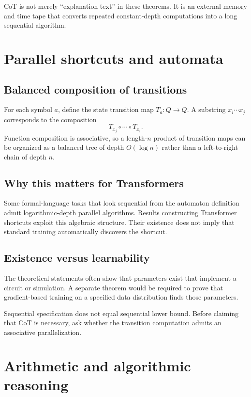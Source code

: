 \documentclass[11pt,a4paper,oneside,openany]{memoir}
\theoremstyle{definition}
\begin{document}
\begin{presentbox}
CoT is not merely ``explanation text'' in these theorems.  It is an external memory and time tape that converts repeated constant-depth computations into a long sequential algorithm.
\end{presentbox}

\chapter{Parallel shortcuts and automata}
\section{Balanced composition of transitions}
For each symbol $a$, define the state transition map $T_a:Q\to Q$.  A substring $x_i\cdots x_j$ corresponds to the composition
\[
T_{x_j}\circ\cdots\circ T_{x_i}.
\]
Function composition is associative, so a length-$n$ product of transition maps can be organized as a balanced tree of depth $O(\log n)$ rather than a left-to-right chain of depth $n$.

\section{Why this matters for Transformers}
Some formal-language tasks that look sequential from the automaton definition admit logarithmic-depth parallel algorithms.  Results constructing Transformer shortcuts exploit this algebraic structure.  Their existence does not imply that standard training automatically discovers the shortcut.

\section{Existence versus learnability}
The theoretical statements often show that parameters exist that implement a circuit or simulation.  A separate theorem would be required to prove that gradient-based training on a specified data distribution finds those parameters.

\begin{presentbox}
Sequential specification does not equal sequential lower bound.  Before claiming that CoT is necessary, ask whether the transition computation admits an associative parallelization.
\end{presentbox}

\chapter{Arithmetic and algorithmic reasoning}
\end{document}
